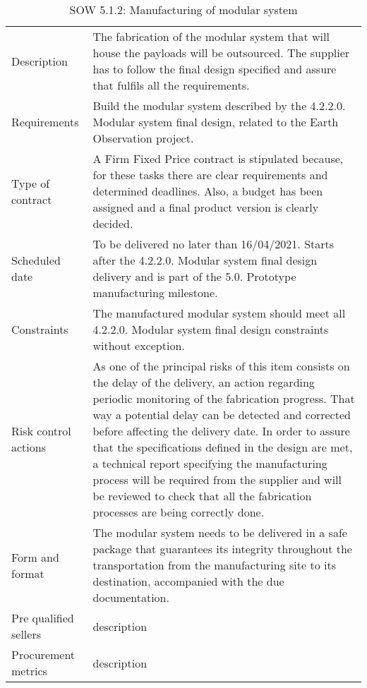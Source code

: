 \begin{table}[H]
	\centering
	\begin{tabular}
		{>{\raggedright\arraybackslash}p{3cm} >{\arraybackslash}p{11cm}}
		
		\toprule[2pt]
		
		\multicolumn{2}{c}{\textbf{SOW - 5.1.2. Manufacturing of modular system}}\\
		
		\midrule[1.5pt]
		
		Description & The fabrication of the modular system that will house the payloads will be outsourced. The supplier has to follow the final design specified and assure that fulfils all the requirements. \\
		\hline
		
		Requirements & Build the modular system described by the 4.2.2.0. Modular system final design, related to the Earth Observation project.\\
		\hline
		
		Type of contract & A Firm Fixed Price contract is stipulated because, for these tasks there are clear requirements and determined deadlines. Also, a budget has been assigned and a final product version is clearly decided.\\
		\hline
		
		Scheduled date & To be delivered no later than 16/04/2021. Starts after the 4.2.2.0. Modular system final design delivery and is part of the 5.0. Prototype manufacturing milestone.\\
		\hline
		
		Constraints & The manufactured modular system should meet all 4.2.2.0. Modular system final design constraints without exception.\\
		\hline
		
		Risk control actions & As one of the principal risks of this item consists on the delay of the delivery, an action regarding periodic monitoring of the fabrication progress. That way a potential delay can be detected and corrected before affecting the delivery date.
		In order to assure that the specifications defined in the design are met, a technical report specifying the manufacturing process will be required from the supplier and will be reviewed to check that all the fabrication processes are being correctly done.\\
		\hline
		
		Form and format & The modular system needs to be delivered in a safe package that guarantees its integrity throughout the transportation from the manufacturing site to its destination, accompanied with the due documentation.\\
		\hline
		
		Pre qualified sellers & description\\
		\hline
		
		Procurement metrics & description\\
		
		\bottomrule[2pt]		
		
	\end{tabular}
	\caption{SOW 5.1.2: Manufacturing of modular system}
\end{table}

